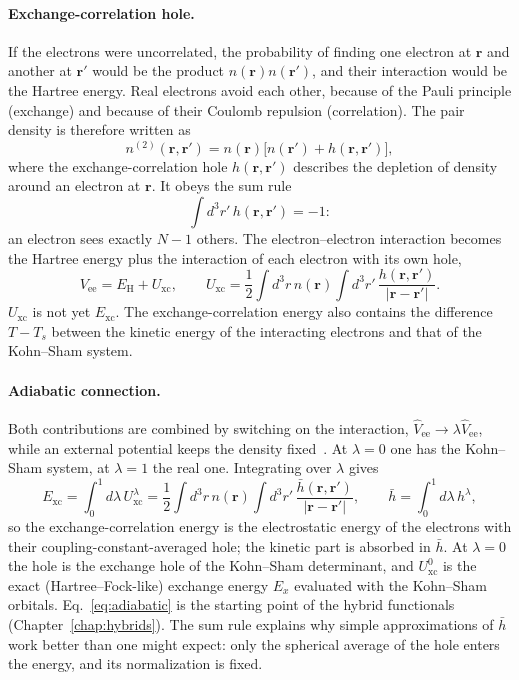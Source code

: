 \documentclass[11pt,a4paper,oneside]{book}
\begin{document}
\paragraph{Exchange-correlation hole.} If the electrons were
uncorrelated, the probability of finding one electron at $\bm r$ and
another at $\bm r'$ would be the product $n(\bm r)n(\bm r')$, and their
interaction would be the Hartree energy. Real electrons avoid each
other, because of the Pauli principle (exchange) and because of their
Coulomb repulsion (correlation). The pair density is therefore written
as
\begin{equation}
  n^{(2)}(\bm r,\bm r')=n(\bm r)\bigl[n(\bm r')+h(\bm r,\bm r')\bigr],
\end{equation}
where the exchange-correlation hole $h(\bm r,\bm r')$ describes the
depletion of density around an electron at $\bm r$. It obeys the sum rule
\begin{equation}
  \int d^3r'\,h(\bm r,\bm r')=-1:
\end{equation}
an electron sees exactly $N-1$ others. The electron--electron
interaction becomes the Hartree energy plus the interaction of each
electron with its own hole,
\begin{equation}
  V_{\mathrm{ee}}=E_{\mathrm H}+U_{\mathrm{xc}},\qquad
  U_{\mathrm{xc}}=\frac12\int d^3r\,n(\bm r)\int d^3r'\,\frac{h(\bm r,\bm r')}{|\bm r-\bm r'|}.
\end{equation}
$U_{\mathrm{xc}}$ is not yet $E_{\mathrm{xc}}$. The exchange-correlation
energy also contains the difference $T-T_s$ between the kinetic energy
of the interacting electrons and that of the Kohn--Sham system.

\paragraph{Adiabatic connection.} Both contributions are combined by
switching on the interaction, $\hat V_{\mathrm{ee}}\to\lambda\hat
V_{\mathrm{ee}}$, while an external potential keeps the density
fixed~\cite{harris74_jpf4_1170,langreth75_ssc17_1425,gunnarsson76_prb13_4274}.
At $\lambda=0$ one has the Kohn--Sham system, at $\lambda=1$ the real
one. Integrating over $\lambda$ gives
\begin{equation}
  E_{\mathrm{xc}}=\int_0^1 d\lambda\,U_{\mathrm{xc}}^\lambda
  =\frac12\int d^3r\,n(\bm r)\int d^3r'\,\frac{\bar h(\bm r,\bm r')}{|\bm r-\bm r'|},
  \qquad
  \bar h=\int_0^1 d\lambda\,h^\lambda ,
  \label{eq:adiabatic}
\end{equation}
so the exchange-correlation energy is the electrostatic energy of the
electrons with their coupling-constant-averaged hole; the kinetic part
is absorbed in $\bar h$. At $\lambda=0$ the hole is the exchange hole of
the Kohn--Sham determinant, and $U_{\mathrm{xc}}^0$ is the exact
(Hartree--Fock-like) exchange energy $E_x$ evaluated with the
Kohn--Sham orbitals. Eq.~\eqref{eq:adiabatic} is the starting point of
the hybrid functionals (Chapter~\ref{chap:hybrids}). The sum rule
explains why simple approximations of $\bar h$ work better than one
might expect: only the spherical average of the hole enters the energy,
and its normalization is fixed.
\end{document}
